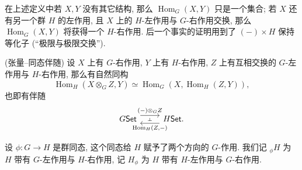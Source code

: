 在上述定义中若 $X,Y$ 没有其它结构, 那么 $\operatorname{Hom}_G(X,Y)$ 只是一个集合; 若 $X$ 还有另一个群 $H$ 的左作用, 且 $X$ 上的 $H$-左作用与 $G$-右作用交换, 那么 $\operatorname{Hom}_G(X,Y)$ 将获得一个 $H$-右作用. 后一个事实的证明用到了 $({-})\times H$ 保持等化子 (``极限与极限交换'').

\begin{prop}
    {(张量--同态伴随)}
    设 $X$ 上有 $G$-右作用, $Y$ 上有 $H$-右作用,
    $Z$ 上有互相交换的 $G$-左作用与 $H$-右作用, 那么有自然同构
    $$
    \operatorname{Hom}_H(X\otimes_G Z,Y)\simeq \operatorname{Hom}_G(X,\operatorname{Hom}_H(Z,Y)),
    $$
    也即有伴随
\[\begin{tikzcd}[ampersand replacement=\&]
	{G\mathsf {Set}} \& {H\mathsf {Set}.}
	\arrow[""{name=0, anchor=center, inner sep=0}, "{(-)\otimes_G Z}", shift left=2, from=1-1, to=1-2]
	\arrow[""{name=1, anchor=center, inner sep=0}, "{\operatorname{Hom}_H(Z,-)}", shift left=2, from=1-2, to=1-1]
	\arrow["\dashv"{anchor=center, rotate=-90}, draw=none, from=0, to=1]
\end{tikzcd}\]
\end{prop}

设 $\phi\colon G\to H$ 是群同态, 这个同态给 $H$ 赋予了两个方向的 $G$-作用.
我们记 ${_\phi H}$ 为 $H$ 带有 $G$-左作用与 $H$-右作用,
记 $H_\phi$ 为 $H$ 带有 $H$-左作用与 $G$-右作用.

